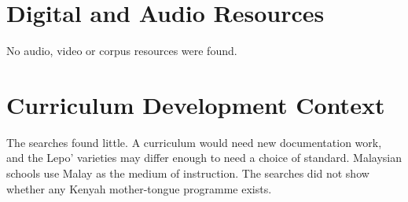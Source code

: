 \documentclass[12pt]{article}
\begin{document}
\section{Digital and Audio Resources}
No audio, video or corpus resources were found.

\section{Curriculum Development Context}
The searches found little. A curriculum would need new documentation work, and the Lepo' varieties may differ enough to need a choice of standard. Malaysian schools use Malay as the medium of instruction. The searches did not show whether any Kenyah mother-tongue programme exists.
\end{document}
